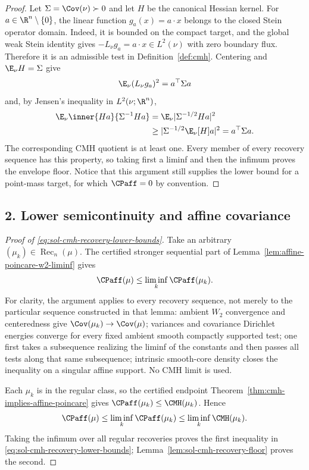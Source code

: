 \documentclass[../main.tex]{subfiles}
\begin{document}
\begin{proof}
Let $\Sigma=\Cov(\nu)\succ0$ and let $H$ be the canonical Hessian kernel.  For
$a\in\R^n\setminus\{0\}$, the linear function $g_a(x)=a\cdot x$ belongs to the closed Stein
operator domain.  Indeed, it is bounded on the compact target, and the global weak Stein
identity gives $-L_\nu g_a=a\cdot x\in L^2(\nu)$ with zero boundary flux.  Therefore it is an
admissible test in Definition~\ref{def:cmh}.  Centering and $\E_\nu H=\Sigma$ give
\[
  \E_\nu(L_\nu g_a)^2=a^\top\Sigma a
\]
and, by Jensen's inequality in $L^2(\nu;\R^n)$,
\begin{align*}
  \E_\nu\inner{Ha}{\Sigma^{-1}Ha}
  &=\E_\nu\lvert\Sigma^{-1/2}Ha\rvert^2\\
  &\ge\lvert\Sigma^{-1/2}\E_\nu[H]a\rvert^2
   =a^\top\Sigma a.
\end{align*}
The corresponding CMH quotient is at least one.  Every member of every recovery sequence has
this property, so taking first a liminf and then the infimum proves the envelope floor.  Notice
that this argument still supplies the lower bound for a point-mass target, for which
$\CPaff=0$ by convention.
\end{proof}

\subsection*{2. Lower semicontinuity and affine covariance}

\begin{proof}[Proof of \eqref{eq:sol-cmh-recovery-lower-bounds}]
Take an arbitrary $(\mu_k)\in\operatorname{Rec}_n(\mu)$.  The certified stronger sequential
part of Lemma~\ref{lem:affine-poincare-w2-liminf} gives
\[
  \CPaff(\mu)\le\liminf_k\CPaff(\mu_k).
\]
For clarity, the argument applies to every recovery sequence, not merely to the particular
sequence constructed in that lemma: ambient $W_2$ convergence and centeredness give
$\Cov(\mu_k)\to\Cov(\mu)$; variances and covariance Dirichlet energies converge for every
fixed ambient smooth compactly supported test; one first takes a subsequence realizing the
liminf of the constants and then passes all tests along that same subsequence; intrinsic
smooth-core density closes the inequality on a singular affine support.  No CMH limit is used.

Each $\mu_k$ is in the regular class, so the certified endpoint
Theorem~\ref{thm:cmh-implies-affine-poincare} gives
$\CPaff(\mu_k)\le\CMH(\mu_k)$.  Hence
\[
  \CPaff(\mu)
  \le\liminf_k\CPaff(\mu_k)
  \le\liminf_k\CMH(\mu_k).
\]
Taking the infimum over all regular recoveries proves the first inequality in
\eqref{eq:sol-cmh-recovery-lower-bounds}; Lemma~\ref{lem:sol-cmh-recovery-floor} proves the
second.
\end{proof}
\end{document}
